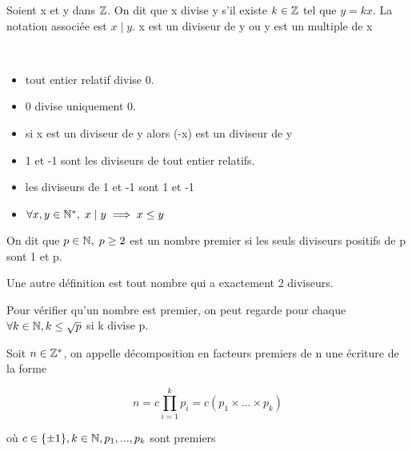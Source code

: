 \documentclass[a4paper, 12pt]{article}
\begin{document}
\begin{definition}
    Soient x et y dans $\mathbb{Z}$. On dit que x divise y s'il existe $k \in \mathbb{Z}$ tel que $y = kx$.
    La notation associée est $x \mid y$.
    x est un diviseur de y ou y est un multiple de x
\end{definition}

\begin{remark}\
    \begin{itemize}
        \item tout entier relatif divise 0.
        
        \item 0 divise uniquement 0.
        
        \item si x est un diviseur de y alors (-x) est un diviseur de y
        
        \item 1 et -1 sont les diviseurs de tout entier relatifs.
        
        \item les diviseurs de 1 et -1 sont 1 et -1
        
        \item $\forall x, y \in \mathbb{N}^*,\; x \mid y \implies x \leq y$
    \end{itemize}
\end{remark}

\begin{definition}
    On dit que $p \in \mathbb{N},\; p \geq 2$ est un nombre premier si les seuls diviseurs positifs de p sont 1 et p.
\end{definition}

\begin{remark}
    Une autre définition est tout nombre qui a exactement 2 diviseurs.
\end{remark}

\begin{remark}
    Pour vérifier qu'un nombre est premier, on peut regarde pour chaque $\forall k \in \mathbb{N}, k \leq \sqrt{p}$ si k divise p.
\end{remark}

\begin{definition}
    Soit $n \in \mathbb{Z}^*$, on appelle décomposition en facteurs premiers de n une écriture de la forme

    $$
    n = c \prod_{i=1}^{k} p_i = c(p_1 \times ... \times p_k)
    $$

    où $c \in \{\pm 1\}, k \in \mathbb{N}, p_1,...,p_k$ sont premiers
\end{definition}
\end{document}
